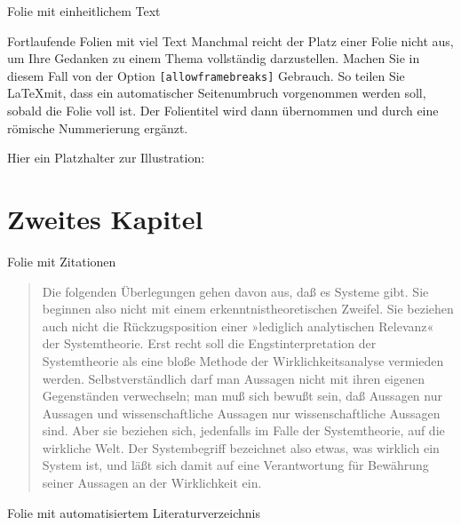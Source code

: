 \documentclass{beamer} %
\begin{document}
\begin{frame}{Folie mit einheitlichem Text}
\lipsum[1]
\end{frame}

\begin{frame}{Fortlaufende Folien mit viel Text} %
Manchmal reicht der Platz einer Folie nicht aus, um Ihre Gedanken zu einem Thema vollständig darzustellen. Machen Sie in diesem Fall von der Option \verb|[allowframebreaks]| Gebrauch. So teilen Sie \LaTeX mit, dass ein automatischer Seitenumbruch vorgenommen werden soll, sobald die Folie voll ist. Der Folientitel wird dann übernommen und durch eine römische Nummerierung ergänzt.\\

\bigskip

Hier ein Platzhalter zur Illustration: \textcolor[rgb]{0.4,0.4,0.4}{\lipsum[1-2]}
\end{frame}

\section{Zweites Kapitel}

\begin{frame}[fragile]{Folie mit Zitationen} 
\begin{quote}
	Die folgenden Überlegungen gehen davon aus, daß es Systeme gibt.
Sie beginnen also nicht mit einem erkenntnistheoretischen Zweifel.
Sie beziehen auch nicht die Rückzugsposition einer »lediglich analytischen Relevanz« der Systemtheorie. Erst recht soll die Engstinterpretation der Systemtheorie als eine bloße Methode der Wirklichkeitsanalyse vermieden werden. Selbstverständlich darf man
Aussagen nicht mit ihren eigenen Gegenständen verwechseln; man
muß sich bewußt sein, daß Aussagen nur Aussagen und wissenschaftliche Aussagen nur wissenschaftliche Aussagen sind. Aber sie
beziehen sich, jedenfalls im Falle der Systemtheorie, auf die wirkliche Welt. Der Systembegriff bezeichnet also etwas, was wirklich ein
System ist, und läßt sich damit auf eine Verantwortung für Bewährung seiner Aussagen an der Wirklichkeit ein.
\end{quote}
\cite{luhmann1984soziale}
\end{frame}



\begin{frame}{Folie mit automatisiertem Literaturverzeichnis}
\printbibliography
\end{frame}
\end{document}
